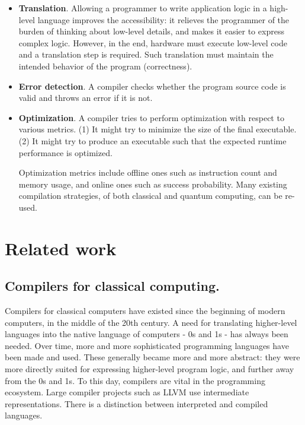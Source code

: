\begin{itemize}

\item \textbf{Translation}.
Allowing a programmer to write application logic in a high-level language improves the accessibility:
it relieves the programmer of the burden of thinking about low-level details, and makes it easier to express complex logic.
However, in the end, hardware must execute low-level code and a translation step is required.
Such translation must maintain the intended behavior of the program (correctness).

\item \textbf{Error detection}.
A compiler checks whether the program source code is valid and throws an error if it is not.

\item \textbf{Optimization}.
A compiler tries to perform optimization with respect to various metrics.
(1) It might try to minimize the size of the final executable.
(2) It might try to produce an executable such that the expected runtime performance is optimized.

Optimization metrics include offline ones such as instruction count and memory usage, and online ones such as success probability.
Many existing compilation strategies, of both classical and quantum computing, can be re-used.

\end{itemize}



\section{Related work}

\subsection{Compilers for classical computing.}
Compilers for classical computers have existed since the beginning of modern computers, in the middle of the 20th century. 
A need for translating higher-level languages into the native language of computers - 0s and 1s - has always been needed.
Over time, more and more sophisticated programming languages have been made and used.
These generally became more and more abstract: they were more directly suited for expressing higher-level program logic, and further away from the 0s and 1s.
To this day, compilers are vital in the programming ecosystem.
Large compiler projects such as LLVM use intermediate representations.
There is a distinction between interpreted and compiled languages.

